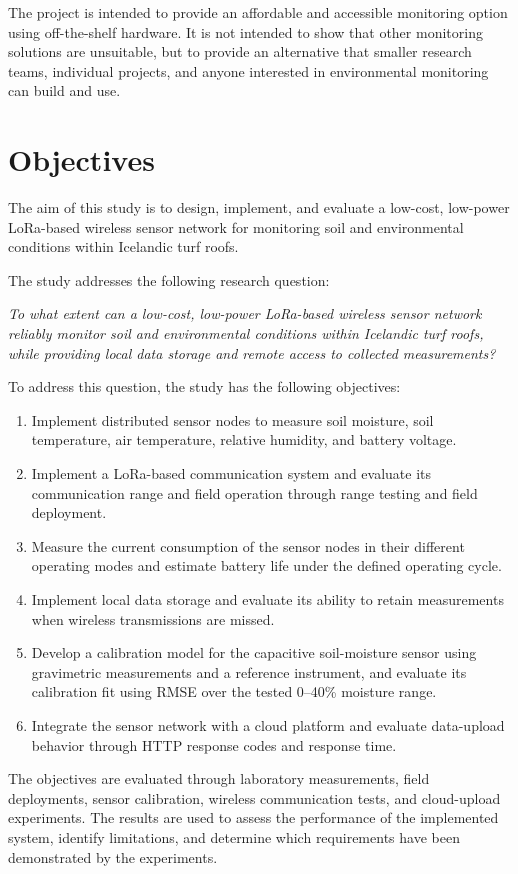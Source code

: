 The project is intended to provide an affordable and accessible monitoring option using off-the-shelf hardware. It is not intended to show that other monitoring solutions are unsuitable, but to provide an alternative that smaller research teams, individual projects, and anyone interested in environmental monitoring can build and use.

\section{Objectives}
The aim of this study is to design, implement, and evaluate a low-cost, low-power LoRa-based wireless sensor network for monitoring soil and environmental conditions within Icelandic turf roofs.

The study addresses the following research question:

\textit{To what extent can a low-cost, low-power LoRa-based wireless sensor network reliably monitor soil and environmental conditions within Icelandic turf roofs, while providing local data storage and remote access to collected measurements?}

To address this question, the study has the following objectives:
\begin{enumerate}
\item Implement distributed sensor nodes to measure soil moisture, soil temperature, air temperature, relative humidity, and battery voltage.
\item Implement a LoRa-based communication system and evaluate its communication range and field operation through range testing and field deployment.
\item Measure the current consumption of the sensor nodes in their different operating modes and estimate battery life under the defined operating cycle.
\item Implement local data storage and evaluate its ability to retain measurements when wireless transmissions are missed.
\item Develop a calibration model for the capacitive soil-moisture sensor using gravimetric measurements and a reference instrument, and evaluate its calibration fit using RMSE over the tested 0--40\% moisture range.
\item Integrate the sensor network with a cloud platform and evaluate data-upload behavior through HTTP response codes and response time.
\end{enumerate}
The objectives are evaluated through laboratory measurements, field deployments, sensor calibration, wireless communication tests, and cloud-upload experiments. The results are used to assess the performance of the implemented system, identify limitations, and determine which requirements have been demonstrated by the experiments.

